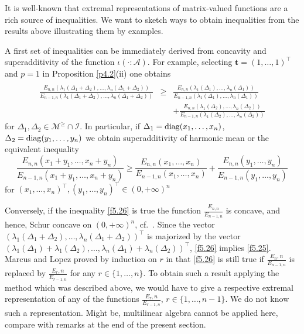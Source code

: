 \documentclass{amsart}
\begin{document}
It is well-known that extremal representations of matrix-valued functions are a rich source of inequalities. We want to sketch ways to obtain inequalities from the results above illustrating them by examples. 

A first set of inequalities can be immediately derived from concavity and superadditivity of the function $\iota( \cdot : {\mathcal A})$. For example, selecting ${\mathbf t}=(1,\ldots,1)^\top$ and $p=1$ in Proposition \ref{p4.2}(ii) one obtains
\begin{eqnarray} \label{f5.25}
& & \\
       \frac{E_{n,n}(\lambda_1(\Delta_1+\Delta_2),\ldots,\lambda_n(\Delta_1+\Delta_2))}{E_{n-1,n}(\lambda_1(\Delta_1+\Delta_2),\ldots,\lambda_n(\Delta_1+\Delta_2))} & \geq &
       \frac{E_{n,n}(\lambda_1(\Delta_1),\ldots,\lambda_n(\Delta_1))}{E_{n-1,n}(\lambda_1(\Delta_1),\ldots,\lambda_n(\Delta_1))} \nonumber \\
       & & +
       \frac{E_{n,n}(\lambda_1(\Delta_2),\ldots,\lambda_n(\Delta_2))}{E_{n-1,n}(\lambda_1(\Delta_2),\ldots,\lambda_n(\Delta_2))} \nonumber
\end{eqnarray}  
for $\Delta_1,\Delta_2 \in {\mathcal M}^\geq \cap \mathcal I$. In particular, if $\Delta_1={\rm diag}(x_1,\ldots,x_n)$, $\Delta_2 = {\rm diag}(y_1,\ldots,y_n)$ we obtain superadditivity of harmonic mean or the equivalent inequality
\begin{equation} \label{f5.26}
       \frac{E_{n,n}(x_1+y_1,\ldots,x_n+y_n)}{E_{n-1,n}(x_1+y_1,\ldots,x_n+y_n)} \geq 
        \frac{E_{n,n}(x_1,\ldots,x_n)}{E_{n-1,n}(x_1,\ldots,x_n)} +
         \frac{E_{n,n}(y_1,\ldots,y_n)}{E_{n-1,n}(y_1,\ldots,y_n)}
\end{equation}
for $(x_1,\ldots,x_n)^\top, (y_1,\ldots,y_n)^\top  \in (0,+\infty)^n$

Conversely, if the inequality \eqref{f5.26} is true the function $\frac{E_{n,n}}{E_{n-1,n}}$ is concave, and hence, Schur concave on $(0,+\infty)^n$, cf.~\cite[Prop.~3.C.2]{MOA}. Since the vector $(\lambda_1(\Delta_1+\Delta_2),\ldots,\lambda_n(\Delta_1+\Delta_2))^\top$ is majorized by the vector $(\lambda_1(\Delta_1)+\lambda_1(\Delta_2),\ldots,\lambda_n(\Delta_1)+\lambda_n(\Delta_2))^\top$, \eqref{f5.26} implies \eqref{f5.25}. Marcus and Lopez proved by induction on $r$ in \cite[Thm.~1]{ML}  that \eqref{f5.26} is still true if $\frac{E_n,n}{E_{n-1,n}}$ is replaced by $\frac{E_r,n}{E_{r-1,n}}$ for any $r \in \{1,\ldots,n\}$.  To obtain such a result applying the method which was described above, we would have to give a respective extremal representation of any of the functions $\frac{E_r,n}{E_{r-1,n}}$, $r \in \{ 1,\ldots,n-1 \}$. We do not know such a representation. Might be, multilinear algebra cannot be applied here, compare with remarks at the end of the present section.  
\end{document}
